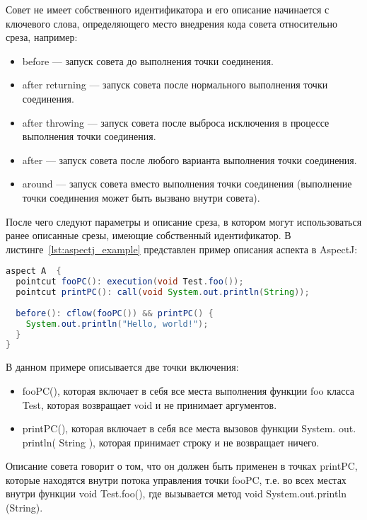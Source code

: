 Совет не имеет собственного идентификатора и его описание начинается с
ключевого слова, определяющего место внедрения кода совета относительно среза,
например:
  \begin{itemize}
    \item before --- запуск совета до выполнения точки соединения.
    \item after returning --- запуск совета после нормального выполнения 
      точки соединения.
    \item after throwing --- запуск совета после выброса исключения в 
      процессе выполнения точки соединения.
    \item after --- запуск совета после любого варианта выполнения точки 
      соединения.
    \item around --- запуск совета вместо выполнения точки соединения 
      (выполнение точки соединения может быть вызвано внутри совета).
  \end{itemize}
После чего следуют параметры и описание среза, в котором могут использоваться
ранее описанные срезы, имеющие собственный идентификатор.
В листинге~\ref{lst:aspectj_example} представлен пример описания аспекта в 
AspectJ:
  \begin{lstlisting}[language=Java, label={lst:aspectj_example}, 
  caption={Пример описания аспектов в AspectJ}]
aspect A  {
  pointcut fooPC(): execution(void Test.foo());
  pointcut printPC(): call(void System.out.println(String));
  
  before(): cflow(fooPC()) && printPC() {
    System.out.println("Hello, world!");
  }
}
  \end{lstlisting}

В данном примере описывается две точки включения:
  \begin{itemize}
    \item fooPC(), которая включает в себя все места выполнения функции foo 
      класса Test, которая возвращает void и не принимает аргументов.
    \item printPC(), которая включает в себя все места вызовов функции 
      System. out. println( String ), которая принимает строку и не 
      возвращает ничего.
  \end{itemize}

Описание совета говорит о том, что он должен быть применен в точках 
printPC, которые находятся внутри потока управления точки fooPC, т.е. во 
всех местах внутри функции void Test.foo(), где вызывается метод void 
System.out.println (String).

